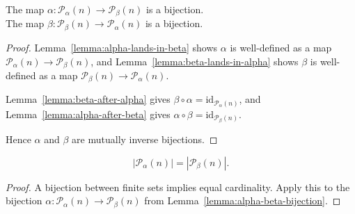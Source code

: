 \begin{lemma}\label{lemma:alpha-beta-bijection}\leanok
The map $\alpha: \mathcal{P}_\alpha(n)\to \mathcal{P}_\beta(n)$ is a bijection. \\
The map $\beta: \mathcal{P}_\beta(n)\to \mathcal{P}_\alpha(n)$ is a bijection.
\end{lemma}
\begin{proof}\leanok
Lemma~\ref{lemma:alpha-lands-in-beta} shows $\alpha$ is well-defined as a map $\mathcal{P}_\alpha(n) \to \mathcal{P}_\beta(n)$, and Lemma~\ref{lemma:beta-lands-in-alpha} shows $\beta$ is well-defined as a map $\mathcal{P}_\beta(n) \to \mathcal{P}_\alpha(n)$.

Lemma~\ref{lemma:beta-after-alpha} gives $\beta \circ \alpha = \mathrm{id}_{\mathcal{P}_\alpha(n)}$, and Lemma~\ref{lemma:alpha-after-beta} gives $\alpha \circ \beta = \mathrm{id}_{\mathcal{P}_\beta(n)}$.

Hence $\alpha$ and $\beta$ are mutually inverse bijections.
\end{proof}

\begin{lemma}\label{lemma:P-alpha-card-eq-P-beta-card}\leanok
$$\left| \mathcal{P}_\alpha(n)\right|=\left|\mathcal{P}_\beta(n) \right|.$$
\end{lemma}
\begin{proof}\leanok
A bijection between finite sets implies equal cardinality. Apply this to the bijection $\alpha: \mathcal{P}_\alpha(n) \to \mathcal{P}_\beta(n)$ from Lemma~\ref{lemma:alpha-beta-bijection}.
\end{proof}


